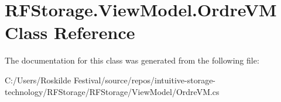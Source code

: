 \hypertarget{class_r_f_storage_1_1_view_model_1_1_ordre_v_m}{}\section{R\+F\+Storage.\+View\+Model.\+Ordre\+VM Class Reference}
\label{class_r_f_storage_1_1_view_model_1_1_ordre_v_m}


The documentation for this class was generated from the following file\+:\begin{DoxyCompactItemize}
\item 
C\+:/\+Users/\+Roskilde Festival/source/repos/intuitive-\/storage-\/technology/\+R\+F\+Storage/\+R\+F\+Storage/\+View\+Model/Ordre\+V\+M.\+cs\end{DoxyCompactItemize}
